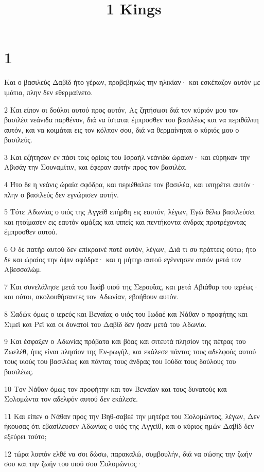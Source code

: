

\title{1 Kings}


\chapter{1}

\par Και ο βασιλεύς Δαβίδ ήτο γέρων, προβεβηκώς την ηλικίαν· και εσκέπαζον αυτόν με ιμάτια, πλην δεν εθερμαίνετο.
\par 2 Και είπον οι δούλοι αυτού προς αυτόν, Ας ζητήσωσι διά τον κύριόν μου τον βασιλέα νεάνιδα παρθένον, διά να ίσταται έμπροσθεν του βασιλέως και να περιθάλπη αυτόν, και να κοιμάται εις τον κόλπον σου, διά να θερμαίνηται ο κύριός μου ο βασιλεύς.
\par 3 Και εζήτησαν εν πάσι τοις ορίοις του Ισραήλ νεάνιδα ώραίαν· και εύρηκαν την Αβισάγ την Σουναμίτιν, και έφεραν αυτήν προς τον βασιλέα.
\par 4 Ήτο δε η νεάνις ώραία σφόδρα, και περιέθαλπε τον βασιλέα, και υπηρέτει αυτόν· πλην ο βασιλεύς δεν εγνώρισεν αυτήν.
\par 5 Τότε Αδωνίας ο υιός της Αγγείθ επήρθη εις εαυτόν, λέγων, Εγώ θέλω βασιλεύσει και ητοίμασεν εις εαυτόν αμάξας και ιππείς και πεντήκοντα άνδρας προτρέχοντας έμπροσθεν αυτού.
\par 6 Ο δε πατήρ αυτού δεν επίκραινέ ποτέ αυτόν, λέγων, Διά τι συ πράττεις ούτω; ήτο δε και ώραίος την όψιν σφόδρα· και η μήτηρ αυτού εγέννησεν αυτόν μετά τον Αβεσσαλώμ.
\par 7 Και συνελάλησε μετά του Ιωάβ υιού της Σερουΐας, και μετά Αβιάθαρ του ιερέως· και ούτοι, ακολουθήσαντες τον Αδωνίαν, εβοήθουν αυτόν.
\par 8 Σαδώκ όμως ο ιερεύς και Βεναΐας ο υιός του Ιωδαέ και Νάθαν ο προφήτης και Σιμεΐ και Ρεΐ και οι δυνατοί του Δαβίδ δεν ήσαν μετά του Αδωνία.
\par 9 Και έσφαξεν ο Αδωνίας πρόβατα και βόας και σιτευτά πλησίον της πέτρας του Ζωελέθ, ήτις είναι πλησίον της Εν-ρωγήλ, και εκάλεσε πάντας τους αδελφούς αυτού τους υιούς του βασιλέως και πάντας τους άνδρας του Ιούδα τους δούλους του βασιλέως.
\par 10 Τον Νάθαν όμως τον προφήτην και τον Βεναΐαν και τους δυνατούς και Σολομώντα τον αδελφόν αυτού δεν εκάλεσε.
\par 11 Και είπεν ο Νάθαν προς την Βηθ-σαβεέ την μητέρα του Σολομώντος, λέγων, Δεν ήκουσας ότι εβασίλευσεν Αδωνίας ο υιός της Αγγείθ, και ο κύριος ημών Δαβίδ δεν εξεύρει τούτο;
\par 12 τώρα λοιπόν ελθέ να σοι δώσω, παρακαλώ, συμβουλήν, διά να σώσης την ζωήν σου και την ζωήν του υιού σου Σολομώντος·
